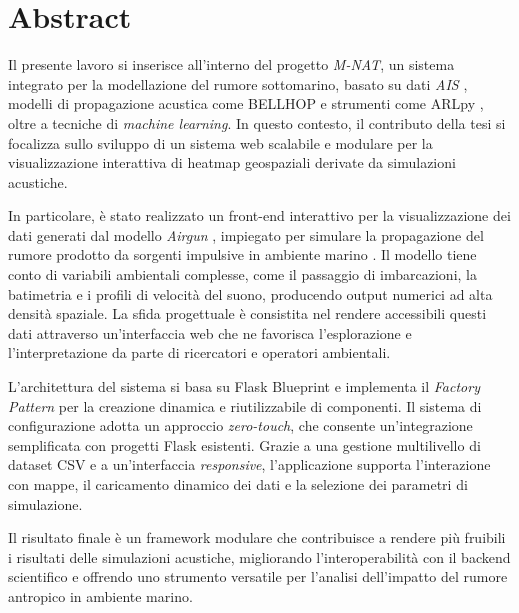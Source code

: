 \chapter*{Abstract}

\vspace{1em}

\noindent
Il presente lavoro si inserisce all'interno del progetto \textit{M-NAT}, un sistema integrato per la modellazione del rumore sottomarino, basato su dati \textit{AIS} \cite{ais-wikipedia}, modelli di propagazione acustica come BELLHOP \cite{bellhop-doc} e strumenti come ARLpy \cite{arlpy-bellhop}, oltre a tecniche di \textit{machine learning}. In questo contesto, il contributo della tesi si focalizza sullo sviluppo di un sistema web scalabile e modulare per la visualizzazione interattiva di heatmap geospaziali derivate da simulazioni acustiche.

\vspace{0.5em}

\noindent
In particolare, è stato realizzato un front-end interattivo per la visualizzazione dei dati generati dal modello \textit{Airgun} \cite{airgun-dosits}, impiegato per simulare la propagazione del rumore prodotto da sorgenti impulsive in ambiente marino \cite{seismic-source}. Il modello tiene conto di variabili ambientali complesse, come il passaggio di imbarcazioni, la batimetria e i profili di velocità del suono, producendo output numerici ad alta densità spaziale. La sfida progettuale è consistita nel rendere accessibili questi dati attraverso un'interfaccia web che ne favorisca l'esplorazione e l'interpretazione da parte di ricercatori e operatori ambientali.

\vspace{0.5em}

\noindent
L'architettura del sistema si basa su Flask Blueprint e implementa il \textit{Factory Pattern} per la creazione dinamica e riutilizzabile di componenti. Il sistema di configurazione adotta un approccio \textit{zero-touch}, che consente un'integrazione semplificata con progetti Flask esistenti. Grazie a una gestione multilivello di dataset CSV e a un'interfaccia \textit{responsive}, l'applicazione supporta l'interazione con mappe, il caricamento dinamico dei dati e la selezione dei parametri di simulazione. 

\vspace{0.5em}

\noindent
Il risultato finale è un framework modulare che contribuisce a rendere più fruibili i risultati delle simulazioni acustiche, migliorando l'interoperabilità con il backend scientifico e offrendo uno strumento versatile per l'analisi dell'impatto del rumore antropico in ambiente marino.

